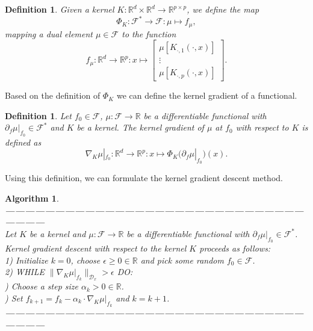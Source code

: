 \documentclass[11pt, a4paper]{article}
\newtheorem{definition}[theorem]{Definition}
\newtheorem{algorithm}[theorem]{Algorithm}
\newcommand{\R}{\mathbb{R}}
\newcommand{\D}{\mathcal{D}}
\newcommand{\F}{\mathcal{F}}
\begin{document}
\begin{definition}
Given a kernel $K: \R^d \times \R^d \to \R^{p \times p}$, we define the map
\[ \Phi_K : \F^* \to \F : \mu \mapsto f_{\mu}, \]
mapping a dual element $\mu \in \F$ to the function
\[ f_{\mu} : \R^d \to \R^p : x \mapsto \begin{bmatrix} \mu [K_{\cdot,1}(\cdot,x) ] \\ \vdots \\ \mu [ K_{\cdot,p}(\cdot,x)] \end{bmatrix}. \]
\end{definition}

Based on the definition of $\Phi_K$ we can define the kernel gradient of a functional.

\begin{definition}
Let $f_0 \in \F$, $\mu : \F \to \R$ be a differentiable functional with $\partial_f\mu|_{f_0} \in \F^*$ and $K$ be a kernel. The kernel gradient of $\mu$ at $f_0$ with respect to $K$ is defined as
\[ \nabla_K\mu|_{f_0}: \R^d \to \R^p : x \mapsto \Phi_K \Big ( \partial_f\mu|_{f_0} \Big )(x). \]
\end{definition}

Using this definition, we can formulate the kernel gradient descent method.

\begin{algorithm}
\textbf{------------------------------------------------------------------------------------------------------} \\
Let $K$ be a kernel and $\mu: \F \to \R$ be a differentiable functional with $\partial_f\mu|_{f_0} \in \F^*$. Kernel gradient descent with respect to the kernel $K$ proceeds as follows: \\

1) Initialize $k=0$, choose $\epsilon \geq 0 \in \R$ and pick some random $f_0 \in \F$. \\

2) WHILE $ \big \| \nabla_K \mu|_{f_k} \big \|_{\D_x} > \epsilon $ DO:\\

) Choose a step size $\alpha_k > 0 \in \R$. \\

) Set $f_{k+1} = f_k - \alpha_k \cdot \nabla_K \mu|_{f_k}$ and $k = k+1$. \\
\textbf{------------------------------------------------------------------------------------------------------}
\end {algorithm}
\end{document}
